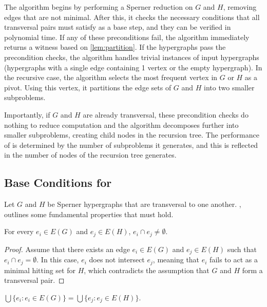 The algorithm begins by performing a Sperner reduction on $G$ and $H$, removing edges that are not minimal. After this, it checks the necessary conditions that all transversal pairs must satisfy as a base step, and they can be verified in polynomial time. If any of these preconditions fail, the algorithm immediately returns a witness based on \ref{lem:partition}. If the hypergraphs pass the precondition checks, the algorithm handles trivial instances of input hypergraphs (hypergraphs with a single edge containing 1 vertex or the empty hypergraph). In the recursive case, the algorithm selects the most frequent vertex in $G$ or $H$ as a pivot. Using this vertex, it partitions the edge sets of $G$ and $H$ into two smaller subproblems.

Importantly, if $G$ and $H$ are already transversal, these precondition checks do nothing to reduce computation and the algorithm decomposes further into smaller subproblems, creating child nodes in the recursion tree. The performance of \FKA{} is determined by the number of subproblems it generates, and this is reflected in the number of nodes of the recursion tree \FKA{} generates.

\cite{FK96-missing}

\subsection{Base Conditions for \FKA}

Let $G$ and $H$ be Sperner hypergraphs that are transversal to one another. \cite{DNU21}, \cite{FK96} outlines some fundamental properties that must hold.

\begin{proposition}\label{prop:intersect}
For every $e_i\in E(G)$ and $e_j\in E(H)$, $e_i\cap e_j\neq\emptyset$.
\end{proposition}

\begin{proof}
Assume that there exists an edge $e_i\in E(G)$ and $e_j\in E(H)$ such that $e_i\cap e_j=\emptyset$. In this case, $e_i$ does not intersect $e_j$, meaning that $e_i$ fails to act as a minimal hitting set for $H$, which contradicts the assumption that $G$ and $H$ form a transversal pair.
\end{proof}

\begin{proposition}\label{prop:support}
$\bigcup\{e_i:e_i\in E(G)\}=\bigcup\{e_j:e_j\in E(H)\}$.
\end{proposition}

